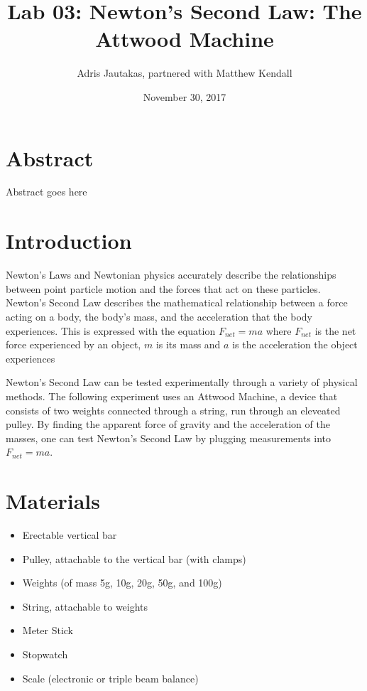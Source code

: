 \documentclass[12pt]{article}
\title{Lab 03: Newton's Second Law: The Attwood Machine}
\author{Adris Jautakas, partnered with Matthew Kendall}
\date{November 30, 2017}
\begin{document}
   \maketitle

    \section*{Abstract}
        {\small 
            Abstract goes here
        }
    \section{Introduction}
        \par Newton's Laws and Newtonian physics accurately describe the 
        relationships between point particle motion and the forces
        that act on these particles.
        Newton's Second Law describes the mathematical relationship 
        between a force acting on a body, the body's mass, and the
        acceleration that the body experiences. This is expressed with
        the equation $F_{net} = ma$ where $F_{net}$ is the net force experienced
        by an object, $m$ is its mass and $a$ is the acceleration the object
        experiences
        \par Newton's Second Law can be tested experimentally through a variety
        of physical methods. The following experiment uses an Attwood Machine,
        a device that consists of two weights connected through a string, run
        through an eleveated pulley. By finding the apparent force of gravity
        and the acceleration of the masses, one can test Newton's Second Law
        by plugging measurements into $F_{net} = ma$.


    \section{Materials}
        \begin{itemize}
            \item Erectable vertical bar
            \item Pulley, attachable to the vertical bar (with clamps)
            \item Weights (of mass 5g, 10g, 20g, 50g, and 100g)
            \item String, attachable to weights
            \item Meter Stick
            \item Stopwatch
            \item Scale (electronic or triple beam balance)
        \end{itemize}
\end{document}
